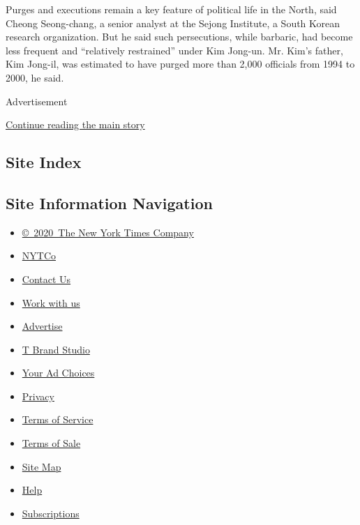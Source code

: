 Purges and executions remain a key feature of political life in the
North, said Cheong Seong-chang, a senior analyst at the Sejong
Institute, a South Korean research organization. But he said such
persecutions, while barbaric, had become less frequent and ``relatively
restrained'' under Kim Jong-un. Mr. Kim's father, Kim Jong-il, was
estimated to have purged more than 2,000 officials from 1994 to 2000, he
said.

Advertisement

\protect\hyperlink{after-bottom}{Continue reading the main story}

\hypertarget{site-index}{%
\subsection{Site Index}\label{site-index}}

\hypertarget{site-information-navigation}{%
\subsection{Site Information
Navigation}\label{site-information-navigation}}

\begin{itemize}
\tightlist
\item
  \href{https://help.nytimes3xbfgragh.onion/hc/en-us/articles/115014792127-Copyright-notice}{©~2020~The
  New York Times Company}
\end{itemize}

\begin{itemize}
\tightlist
\item
  \href{https://www.nytco.com/}{NYTCo}
\item
  \href{https://help.nytimes3xbfgragh.onion/hc/en-us/articles/115015385887-Contact-Us}{Contact
  Us}
\item
  \href{https://www.nytco.com/careers/}{Work with us}
\item
  \href{https://nytmediakit.com/}{Advertise}
\item
  \href{http://www.tbrandstudio.com/}{T Brand Studio}
\item
  \href{https://www.nytimes3xbfgragh.onion/privacy/cookie-policy\#how-do-i-manage-trackers}{Your
  Ad Choices}
\item
  \href{https://www.nytimes3xbfgragh.onion/privacy}{Privacy}
\item
  \href{https://help.nytimes3xbfgragh.onion/hc/en-us/articles/115014893428-Terms-of-service}{Terms
  of Service}
\item
  \href{https://help.nytimes3xbfgragh.onion/hc/en-us/articles/115014893968-Terms-of-sale}{Terms
  of Sale}
\item
  \href{https://spiderbites.nytimes3xbfgragh.onion}{Site Map}
\item
  \href{https://help.nytimes3xbfgragh.onion/hc/en-us}{Help}
\item
  \href{https://www.nytimes3xbfgragh.onion/subscription?campaignId=37WXW}{Subscriptions}
\end{itemize}
